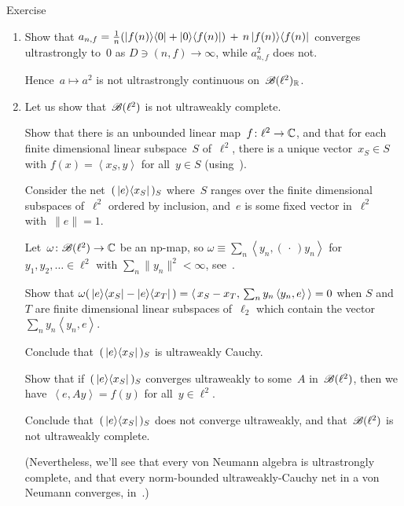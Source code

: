 \documentclass[a]{subfiles}
\begin{document}
\begin{parsec}
\begin{point}{Exercise}
\begin{enumerate}
\item
Show that
$a_{n,f} = \frac{1}{n}(\left|f(n)\right>\!\left<0\right|+\left|0\right>\!\left<f(n)\right|)
\,+\, n\left|f(n)\right>\!\left<f(n)\right|$
converges ultrastrongly to~$0$
as $D\ni(n,f)\to\infty$,
while $a_{n,f}^2$ does not.

Hence~$a\mapsto a^2$ is not ultrastrongly continuous on~$\mathscr{B}(\ell^2)_{\mathbb{R}}$.

\item
Let us show that~$\mathscr{B}(\ell^2)$
is not ultraweakly complete.

Show that there is an unbounded linear map~$f\colon \ell^2\to\mathbb{C}$,
and that for each finite dimensional linear subspace~$S$ of~$\ell^2$,
there is a unique vector~$x_S\in S$ 
with
$f(x)=\left<x_S,y\right>$ for all~$y\in S$
(using~).

Consider the net~$(\,\left|e\right>\!\left<x_S\right|\,)_S$
where~$S$ ranges over the finite dimensional subspaces of~$\ell^2$
ordered by inclusion,
and~$e$ is some fixed vector in~$\ell^2$ with~$\|e\|=1$.

Let~$\omega\colon \mathscr{B}(\ell^2)\to\mathbb{C}$
be an np-map,
so $\omega\equiv \sum_n \left<y_n,(\,\cdot\,)y_n\right>$
for $y_1,y_2,\dotsc \in \ell^2$ with $\sum_n \|y_n\|^2 <\infty$,
see~.

Show that $\omega(\,\left|e\right>\!\left<x_S\right|-\left|e\right>\!\left<x_T\right|\,)
= \left<\,x_S-x_T,\,\sum_n y_n\left<y_n,e\right>\,\right> = 0$
when $S$ and~$T$ are finite dimensional linear subspaces of~$\ell_2$
which contain the vector $\sum_n y_n\left<y_n,e\right>$.

Conclude that~$(\,\left|e\right>\!\left<x_S\right|\,)_S$
is ultraweakly Cauchy.

Show that if~$(\,\left|e\right>\!\left<x_S\right|\,)_S$
converges ultraweakly to some~$A$ in~$\mathscr{B}(\ell^2)$,
then we have~$\left<e,Ay\right>=f(y)$
for all~$y\in\ell^2$.

Conclude that~$(\,\left|e\right>\!\left<x_S\right|\,)_S$
does not converge ultraweakly,
and that~$\mathscr{B}(\ell^2)$ is not ultraweakly complete.

(Nevertheless, we'll see that every von Neumann algebra
is ultrastrongly complete, and that
every norm-bounded ultraweakly-Cauchy net
in a von Neumann converges, in~.)
\end{enumerate}
\end{point}
\end{parsec}
\end{document}
